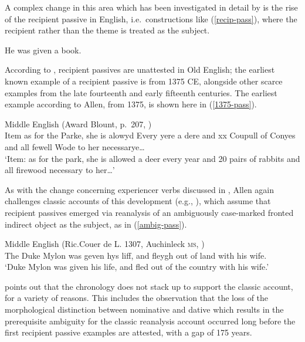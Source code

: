 \documentclass[output=paper,hidelinks]{langscibook}
\begin{document}
A complex change in this area which has been investigated in detail by \citet{allen1995case,Allen01} is the rise of the recipient passive in English, i.e.~constructions like (\ref{recip-pass}), where the recipient rather than the theme is treated as the subject.  

\begin{exe}
\ex \label{recip-pass}
He was given a book. 
\end{exe}

\noindent According to \citet{Allen01}, recipient passives are unattested in Old English; the earliest known example of a recipient passive is from 1375 CE, alongside other scarce examples from the late fourteenth and early fifteenth centuries. The earliest example according to Allen, from 1375, is shown here in  (\ref{1375-pass}).

\begin{exe}
  \ex \label{1375-pass} Middle English  (Award Blount, p.~207, \citealp[51]{Allen01})\\
  Item as for the Parke, she is alowyd Every yere a dere and xx Coupull of Conyes and all fewell Wode to her necessarye\dots\\
`Item: as for the park, she is allowed a deer every year and 20 pairs of rabbits and all firewood necessary to her\dots' 

\end{exe}


 As with the change concerning experiencer verbs discussed in ,  Allen again challenges classic accounts of this development (e.g., \citealp{jespersen1927modern,vanderGaaf1929conversion,campbell1998historical}), which assume that recipient passives emerged via reanalysis of an ambiguously case-marked fronted indirect object as the subject, as in (\ref{ambig-pass}).


\begin{exe} 
\ex \label{ambig-pass}Middle English (Ric.Couer de L. 1307, Auchinleck \textsc{ms}, \citealp[49]{Allen01})\\
The Duke Mylon was geven hys liff, and fleygh out of land with his wife.\\
`Duke Mylon was given his life, and fled out of the country with his wife.' 
\end{exe}

\noindent \citet{Allen01} points out that the chronology does not stack up to support the classic account, for a variety of reasons. This includes the observation that the loss of the morphological distinction between nominative and dative which results in the prerequisite ambiguity for the classic reanalysis account occurred long before the first recipient passive examples are attested, with a gap of 175 years.
\end{document}
